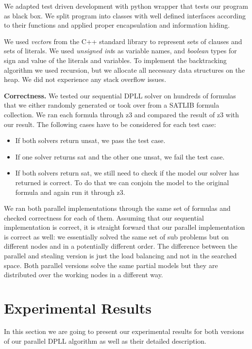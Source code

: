 \documentclass[letterpaper]{article}
\newcommand{\mypar}[1]{{\bf #1.}}
\begin{document}
We adapted test driven development with python wrapper that tests our program as black box.
We split program into classes with well defined interfaces according to their functions and applied proper encapsulation and information hiding.
\fi

We used \textit{vector}s from the C++ standard library to represent sets of clauses and sets of literals.
We used \textit{unsigned int}s as variable names, and \textit{boolean} types for sign and value of the literals and variables.
To implement the backtracking algorithm we used recursion, but we allocate all necessary data structures on the heap.
We did not experience any stack overflow issues.

\mypar{Correctness}
We tested our sequential DPLL solver on hundreds of formulas that we either randomly generated or took over from a SATLIB formula collection. \cite{cnf_website}
We ran each formula through z3 \cite{z3} and compared the result of z3 with our result.
The following cases have to be considered for each test case:
\begin{itemize}
    \item If both solvers return unsat, we pass the test case.
    \item If one solver returns sat and the other one unsat, we fail the test case.
    \item If both solvers return sat, we still need to check if the model our solver has returned is correct.
        To do that we can conjoin the model to the original formula and again run it through z3.
\end{itemize}

We ran both parallel implementations through the same set of formulas and checked correctness for each of them.
Assuming that our sequential implementation is correct, it is straight forward that our parallel implementation is correct as well:
we essentially solved the same set of sub problems but on different nodes and in a potentially different order.
The difference between the parallel and stealing version is just the load balancing and not in the searched space.
Both parallel versions solve the same partial models but they are distributed over the working nodes in a different way.

\section{Experimental Results}\label{sec:exp}
In this section we are going to present our experimental results for both versions of our parallel DPLL algorithm as well as their detailed description.
\end{document}
